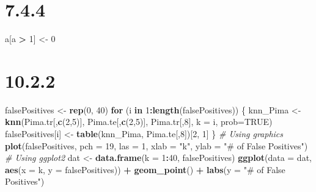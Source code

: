 \documentclass[
]{krantz}
\makeatletter
\newenvironment{Shaded}{\begin{snugshade}}{\end{snugshade}}
\newcommand{\CommentTok}[1]{\textcolor[rgb]{0.37,0.37,0.37}{\textit{#1}}}
\newcommand{\ControlFlowTok}[1]{\textcolor[rgb]{0.27,0.27,0.27}{\textbf{#1}}}
\newcommand{\DataTypeTok}[1]{\textcolor[rgb]{0.27,0.27,0.27}{#1}}
\newcommand{\DecValTok}[1]{\textcolor[rgb]{0.06,0.06,0.06}{#1}}
\newcommand{\KeywordTok}[1]{\textcolor[rgb]{0.27,0.27,0.27}{\textbf{#1}}}
\newcommand{\NormalTok}[1]{#1}
\newcommand{\OperatorTok}[1]{\textcolor[rgb]{0.43,0.43,0.43}{\textbf{#1}}}
\newcommand{\OtherTok}[1]{\textcolor[rgb]{0.37,0.37,0.37}{#1}}
\newcommand{\StringTok}[1]{\textcolor[rgb]{0.5,0.5,0.5}{#1}}
\newenvironment{kframe}{%
\medskip{}
\setlength{\fboxsep}{.8em}
 \def\at@end@of@kframe{}%
 \ifinner\ifhmode%
  \def\at@end@of@kframe{\end{minipage}}%
  \begin{minipage}{\columnwidth}%
 \fi\fi%
 \def\FrameCommand##1{\hskip\@totalleftmargin \hskip-\fboxsep
 \colorbox{shadecolor}{##1}\hskip-\fboxsep
     \hskip-\linewidth \hskip-\@totalleftmargin \hskip\columnwidth}%
 \MakeFramed {\advance\hsize-\width
   \@totalleftmargin\z@ \linewidth\hsize
   \@setminipage}}%
 {\par\unskip\endMakeFramed%
 \at@end@of@kframe}
\renewenvironment{Shaded}{\begin{kframe}}{\end{kframe}}
\makeatother
\begin{document}
\hypertarget{section-10}{%
\section*{7.4.4}\label{section-10}}


\begin{Shaded}
\begin{Highlighting}[]
\NormalTok{a[a }\OperatorTok{\textgreater{}}\StringTok{ }\DecValTok{1}\NormalTok{] \textless{}{-}}\StringTok{ }\DecValTok{0}
\end{Highlighting}
\end{Shaded}

\hypertarget{section-11}{%
\section*{10.2.2}\label{section-11}}


\begin{Shaded}
\begin{Highlighting}[]
\NormalTok{falsePositives \textless{}{-}}\StringTok{ }\KeywordTok{rep}\NormalTok{(}\DecValTok{0}\NormalTok{, }\DecValTok{40}\NormalTok{)}
\ControlFlowTok{for}\NormalTok{ (i }\ControlFlowTok{in} \DecValTok{1}\OperatorTok{:}\KeywordTok{length}\NormalTok{(falsePositives)) \{}
\NormalTok{  knn\_Pima \textless{}{-}}\StringTok{ }\KeywordTok{knn}\NormalTok{(Pima.tr[,}\KeywordTok{c}\NormalTok{(}\DecValTok{2}\NormalTok{,}\DecValTok{5}\NormalTok{)], Pima.te[,}\KeywordTok{c}\NormalTok{(}\DecValTok{2}\NormalTok{,}\DecValTok{5}\NormalTok{)], Pima.tr[,}\DecValTok{8}\NormalTok{], }\DataTypeTok{k =}\NormalTok{ i, }\DataTypeTok{prob=}\OtherTok{TRUE}\NormalTok{)}
\NormalTok{  falsePositives[i] \textless{}{-}}\StringTok{ }\KeywordTok{table}\NormalTok{(knn\_Pima, Pima.te[,}\DecValTok{8}\NormalTok{])[}\DecValTok{2}\NormalTok{, }\DecValTok{1}\NormalTok{]}
\NormalTok{\}}
\CommentTok{\# Using graphics}
\KeywordTok{plot}\NormalTok{(falsePositives, }\DataTypeTok{pch =} \DecValTok{19}\NormalTok{, }\DataTypeTok{las =} \DecValTok{1}\NormalTok{, }\DataTypeTok{xlab =} \StringTok{"k"}\NormalTok{, }\DataTypeTok{ylab =} \StringTok{"\# of False Positives"}\NormalTok{)}
\CommentTok{\# Using ggplot2}
\NormalTok{dat \textless{}{-}}\StringTok{ }\KeywordTok{data.frame}\NormalTok{(}\DataTypeTok{k =} \DecValTok{1}\OperatorTok{:}\DecValTok{40}\NormalTok{, falsePositives)}
\KeywordTok{ggplot}\NormalTok{(}\DataTypeTok{data =}\NormalTok{ dat, }\KeywordTok{aes}\NormalTok{(}\DataTypeTok{x =}\NormalTok{ k, }\DataTypeTok{y =}\NormalTok{ falsePositives)) }\OperatorTok{+}\StringTok{ }
\StringTok{  }\KeywordTok{geom\_point}\NormalTok{() }\OperatorTok{+}\StringTok{ }
\StringTok{  }\KeywordTok{labs}\NormalTok{(}\DataTypeTok{y =} \StringTok{"\# of False Positives"}\NormalTok{)}
\end{Highlighting}
\end{Shaded}
\end{document}
